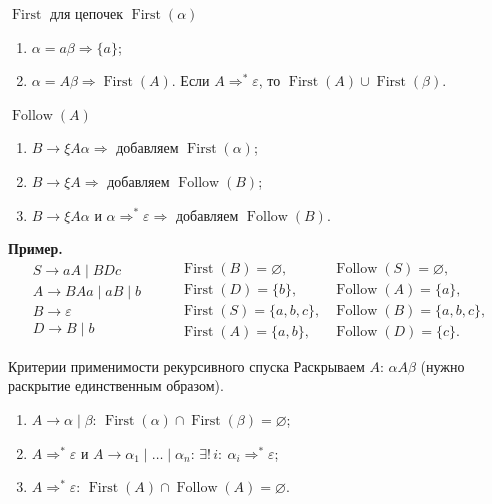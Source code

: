 \documentclass[11pt,a4paper]{article}
\newcommand{\rul}{\rightarrow}
\begin{document}
\begin{kvb}{$\operatorname{First}$ для цепочек $\operatorname{First}(\alpha)$}
\begin{enumerate}
\item $\alpha=a\beta\Rightarrow\{a\}$;
\item $\alpha=A\beta\Rightarrow\operatorname{First}(A)$. Если $A\Rightarrow^*\varepsilon$, то $\operatorname{First}(A)\cup\operatorname{First}(\beta)$.
\end{enumerate}
\end{kvb}

\begin{kvb}{$\operatorname{Follow}(A)$}
\begin{enumerate}
\item $B\rul\xi A\alpha\Rightarrow$ добавляем $\operatorname{First}(\alpha)$;
\item $B\rul\xi A\Rightarrow$ добавляем $\operatorname{Follow}(B)$;
\item $B\rul\xi A\alpha$ и $\alpha\Rightarrow^*\varepsilon\Rightarrow$ добавляем $\operatorname{Follow}(B)$.
\end{enumerate}
\end{kvb}

\textbf{Пример.}
\[
\begin{array}{l}
S\rul aA\mid BDc\\ A\rul BAa\mid aB\mid b\\ B\rul\varepsilon\\ D\rul B\mid b
\end{array}
\qquad
\begin{array}{ll}
\operatorname{First}(B)=\varnothing, & \operatorname{Follow}(S)=\varnothing,\\
\operatorname{First}(D)=\{b\}, & \operatorname{Follow}(A)=\{a\},\\
\operatorname{First}(S)=\{a,b,c\}, & \operatorname{Follow}(B)=\{a,b,c\},\\
\operatorname{First}(A)=\{a,b\}, & \operatorname{Follow}(D)=\{c\}.
\end{array}
\]

\begin{kob}{Критерии применимости рекурсивного спуска}
Раскрываем $A$: $\alpha A\beta$ (нужно раскрытие единственным образом).
\begin{enumerate}
\item $A\rul\alpha\mid\beta$: \quad $\operatorname{First}(\alpha)\cap\operatorname{First}(\beta)=\varnothing$;
\item $A\Rightarrow^*\varepsilon$ и $A\rul\alpha_1\mid\dots\mid\alpha_n$: \quad $\exists!\,i:\ \alpha_i\Rightarrow^*\varepsilon$;
\item $A\Rightarrow^*\varepsilon$: \quad $\operatorname{First}(A)\cap\operatorname{Follow}(A)=\varnothing$.
\end{enumerate}
\end{kob}
\end{document}
